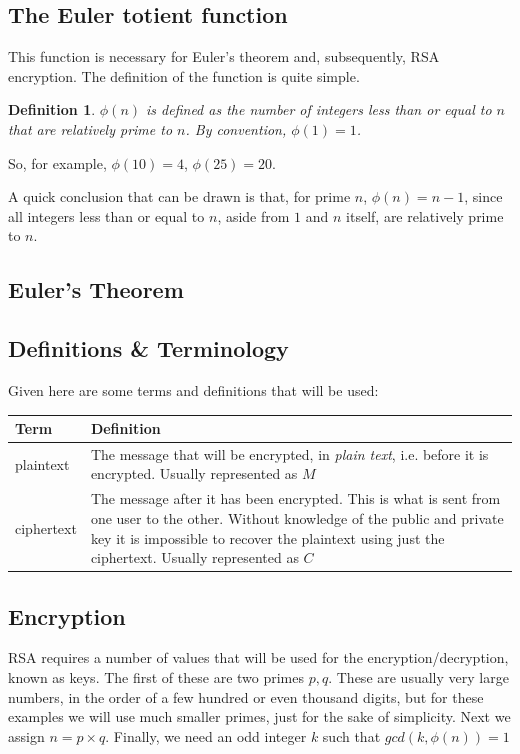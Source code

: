 \documentclass[12pt, titlepage]{article}
\newtheorem*{definition}{Definition}
\begin{document}
    \subsection{The Euler totient function}
    This function is necessary for Euler's theorem and, subsequently, RSA encryption. The
    definition of the function is quite simple.
    \begin{definition}
        $\phi(n)$ is defined as the \emph{number} of integers less than or equal to $n$ that
        are relatively prime to $n$. By convention, $\phi(1) = 1$.
    \end{definition}
    So, for example, $\phi(10) = 4$, $\phi(25) = 20$.

    A quick conclusion that can be drawn is that, for prime $n$, $\phi(n) = n - 1$, since
    all integers less than or equal to $n$, aside from $1$ and $n$ itself, are relatively
    prime to $n$.

    \subsection{Euler's Theorem}
    
    \subsection{Definitions \& Terminology}
    Given here are some terms and definitions that will be used:
    \begin{table}[H]
        \begin{tabular}{ | m{5em} | p{30em} | }
            \hline
            Term      & Definition\\
            \hline
            plaintext & The message that will be encrypted, in \emph{plain
                        text}, i.e. before it is encrypted. Usually represented as $M$\\
            \hline
            ciphertext & The message after it has been encrypted. This is what
                         is sent from one user to the other. Without
                         knowledge of the public and private key it is
                         impossible to recover the plaintext using just the
                         ciphertext. Usually represented as $C$\\
            \hline
        \end{tabular}
    \end{table}
    \subsection{Encryption}
    RSA requires a number of values that will be used for the encryption/decryption, known
    as keys.  The first of these are two primes $p,q$. These are usually very large numbers,
    in the order of a few hundred or even thousand digits, but for these examples we will
    use much smaller primes, just for the sake of simplicity. Next we assign $n=p \times q$.
    Finally, we need an odd integer $k$ such that $gcd(k, \phi (n)) = 1$ 
\end{document}

